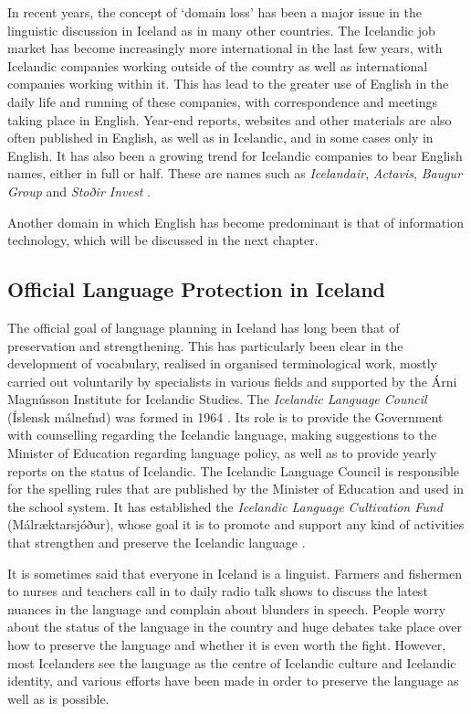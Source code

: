 \begin{multicols}{2}
In recent years, the concept of ‘domain loss’ has been a major issue in the linguistic discussion in Iceland as in many other countries. The Icelandic job market has become increasingly more international in the last few years, with Icelandic companies working outside of the country as well as international companies working within it. This has lead to the greater use of English in the daily life and running of these companies, with correspondence and meetings taking place in English. Year-end reports, websites and other materials are also often published in English, as well as in Icelandic, and in some cases only in English. It has also been a growing trend for Icelandic companies to bear English names, either in full or half. These are names such as \textit{Icelandair}, \textit{Actavis}, \textit{Baugur Group} and \textit{Stoðir Invest} \cite{isl1}.  

Another domain in which English has become predominant is that of information technology, which will be discussed in the next chapter.

\subsection{Official Language Protection in Iceland}

The official goal of language planning in Iceland has long been that of preservation and strengthening. This has particularly been clear in the development of vocabulary, realised in organised terminological work, mostly carried out voluntarily by specialists in various fields and supported by the Árni Magnússon Institute for Icelandic Studies. The \textit{Icelandic Language Council} (Íslensk málnefnd) was formed in 1964 \cite{arn1}.  
Its role is to provide the Government with counselling regarding the Icelandic language, making suggestions to the Minister of Education regarding language policy, as well as to provide yearly reports on the status of Icelandic. 
The Icelandic Language Council is responsible for the spelling rules that are published by the Minister of Education and used in the school system. It has established the \textit{Icelandic Language Cultivation Fund} (Mál\-ræktar\-sjóður), whose goal it is to promote and support any kind of activities that strengthen and preserve the Icelandic language \cite{arn2}.

It is sometimes said that everyone in Iceland is a linguist. Farmers and fishermen to nurses and teachers call in to daily radio talk shows to discuss the latest nuances in the language and complain about blunders in speech. People worry about the status of the language in the country and huge debates take place over how to preserve the language and whether it is even worth the fight. However, most Icelanders see the language as the centre of Icelandic culture and Icelandic identity, and various efforts have been made in order to preserve the language as well as is possible.


\end{multicols}
